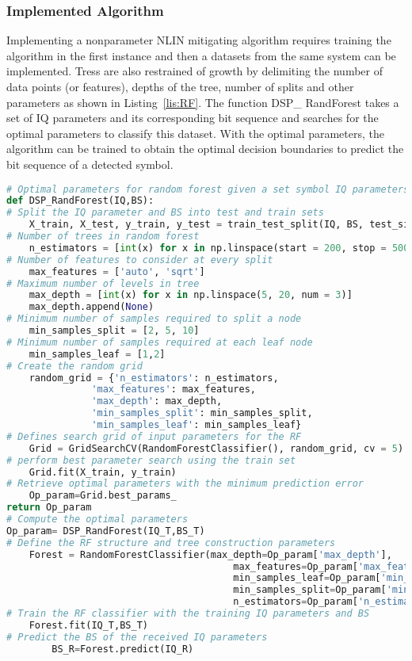 \subsubsection{Implemented Algorithm}
Implementing a nonparameter NLIN mitigating algorithm requires training the algorithm in the first instance and then a datasets from the same system can be implemented. Tress are also restrained of growth by delimiting the number of data points (or features), depths of the tree, number of splits and other parameters as shown in Listing~\ref{lis:RF}. The function DSP\_ RandForest takes a set of IQ parameters and its corresponding bit sequence and searches for the optimal parameters to classify this dataset. With the optimal parameters, the algorithm can be trained to obtain the optimal decision boundaries to predict the bit sequence of a detected symbol.    


\begin{lstlisting}[language=Python,caption=Random forest implementation in python where the optimal parameter are determined from a training dataset. With the optimal parameters the scheme can classify a new set of IQ parameters and determine the decode bit sequence.,label=lis:RF]
# Optimal parameters for random forest given a set symbol IQ parameters and the decoded bit sequence BS
def DSP_RandForest(IQ,BS):
# Split the IQ parameter and BS into test and train sets
	X_train, X_test, y_train, y_test = train_test_split(IQ, BS, test_size = 0.2)
# Number of trees in random forest
	n_estimators = [int(x) for x in np.linspace(start = 200, stop = 500, num = 3)]
# Number of features to consider at every split
	max_features = ['auto', 'sqrt']
# Maximum number of levels in tree
	max_depth = [int(x) for x in np.linspace(5, 20, num = 3)]
	max_depth.append(None)
# Minimum number of samples required to split a node
	min_samples_split = [2, 5, 10]
# Minimum number of samples required at each leaf node
	min_samples_leaf = [1,2]
# Create the random grid
	random_grid = {'n_estimators': n_estimators,
               'max_features': max_features,
               'max_depth': max_depth,
               'min_samples_split': min_samples_split,
               'min_samples_leaf': min_samples_leaf}
# Defines search grid of input parameters for the RF 
    Grid = GridSearchCV(RandomForestClassifier(), random_grid, cv = 5)
# perform best parameter search using the train set
    Grid.fit(X_train, y_train)
# Retrieve optimal parameters with the minimum prediction error 
    Op_param=Grid.best_params_
return Op_param
# Compute the optimal parameters
Op_param= DSP_RandForest(IQ_T,BS_T)
# Define the RF structure and tree construction parameters  
	Forest = RandomForestClassifier(max_depth=Op_param['max_depth'],
										max_features=Op_param['max_features'],
										min_samples_leaf=Op_param['min_samples_leaf'],
										min_samples_split=Op_param['min_samples_split'],
										n_estimators=Op_param['n_estimators'])
# Train the RF classifier with the training IQ parameters and BS       
    Forest.fit(IQ_T,BS_T)
# Predict the BS of the received IQ parameters 
    	BS_R=Forest.predict(IQ_R)
\end{lstlisting}



